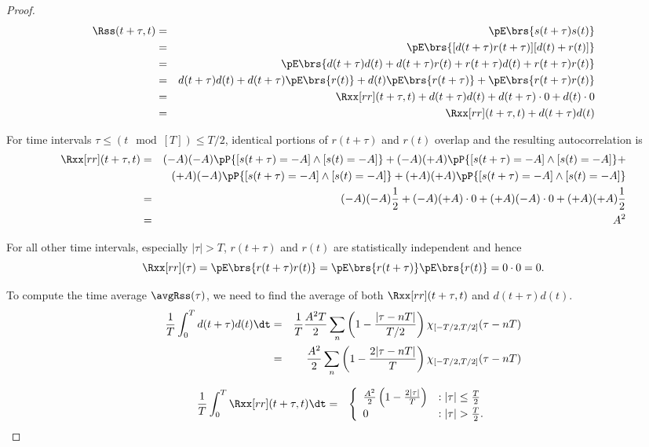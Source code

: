 \begin{proof}
\begin{eqnarray*}
   \Rss(t+\tau,t) 
     &=& \pE\brs{s(t+\tau)s(t)} 
   \\&=& \pE\brs{[d(t+\tau)r(t+\tau)][d(t)+r(t)]} 
   \\&=& \pE\brs{d(t+\tau)d(t) + d(t+\tau)r(t) + r(t+\tau)d(t)+ r(t+\tau)r(t)} 
   \\&=& d(t+\tau)d(t) + d(t+\tau)\pE\brs{r(t)} + d(t)\pE\brs{r(t+\tau)}+ \pE\brs{r(t+\tau)r(t)} 
   \\&=& \Rxx[rr](t+\tau,t) + d(t+\tau)d(t) + d(t+\tau)\cdot0 + d(t)\cdot0 
   \\&=& \Rxx[rr](t+\tau,t) + d(t+\tau)d(t) 
\end{eqnarray*}

For time intervals $\tau \le (t\mod[T])\le T/2$, 
identical portions of $r(t+\tau)$ and $r(t)$
overlap and the resulting autocorrelation is
\begin{eqnarray*}
   \Rxx[rr](t+\tau,t) 
     &=& (-A)(-A)\pP{[s(t+\tau)=-A]\land [s(t)=-A]} + 
         (-A)(+A)\pP{[s(t+\tau)=-A]\land [s(t)=-A]} + \\&&
         (+A)(-A)\pP{[s(t+\tau)=-A]\land [s(t)=-A]} + 
         (+A)(+A)\pP{[s(t+\tau)=-A]\land [s(t)=-A]} 
   \\&=& (-A)(-A)\frac{1}{2} + 
         (-A)(+A)\cdot 0 +
         (+A)(-A)\cdot 0 +
         (+A)(+A)\frac{1}{2} 
   \\&=& A^2
\end{eqnarray*}

For all other time intervals, especially $|\tau|>T$,
$r(t+\tau)$ and $r(t)$ are statistically independent and hence
 \[ \Rxx[rr](\tau) = \pE\brs{r(t+\tau)r(t)} = \pE\brs{r(t+\tau)}\pE\brs{r(t)} = 0\cdot0 = 0.\]


To compute the time average $\avgRss(\tau)$,
we need to find the average of both $\Rxx[rr](t+\tau,t)$ and $d(t+\tau)d(t)$.
\begin{eqnarray*}
   \frac{1}{T}\int_0^T d(t+\tau)d(t) \dt
     &=& \frac{1}{T} \frac{A^2 T}{2} \sum_n \left( 1 - \frac{|\tau-nT|}{T/2} \right)\chi_{[-T/2,T/2]}(\tau-nT)
   \\&=& \frac{A^2}{2} \sum_n \left( 1 - \frac{2|\tau-nT|}{T} \right)\chi_{[-T/2,T/2]}(\tau-nT)
\end{eqnarray*}

\begin{eqnarray*}
   \frac{1}{T}\int_0^T  \Rxx[rr](t+\tau,t) \dt
     &=& \left\{
         \begin{array}{ll}
            \frac{A^2}{2}\left( 1- \frac{2|\tau|}{T}\right) &:|\tau|\le \frac{T}{2} \\
            0 & :|\tau|>\frac{T}{2}.
         \end{array}
         \right.
\end{eqnarray*}


\end{proof}
